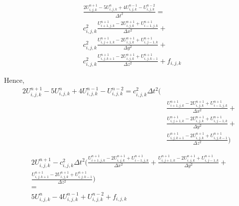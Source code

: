 \documentclass[12pt,a4paper]{report}
\begin{document}
\begin{equation}
\begin{aligned}
&\frac{2 U^{n+1}_{i,j,k} - 5 U^{n}_{i,j,k} + 4 U^{n-1}_{i,j,k} - U^{n-2}_{i,j,k}}{\Delta t^2} = \\
& c^2_{i,j,k} \frac{U^{n+1}_{i+1,j,k} - 2 U^{n+1}_{i,j,k} + U^{n+1}_{i-1,j,k}}{\Delta x^2} +\\
& c^2_{i,j,k} \frac{U^{n+1}_{i,j+1,k} - 2 U^{n+1}_{i,j,k} + U^{n+1}_{i,j-1,k}}{\Delta y^2} + \\
& c^2_{i,j,k} \frac{U^{n+1}_{i,j,k+1} - 2 U^{n+1}_{i,j,k} + U^{n+1}_{i,j,k-1}}{\Delta z^2} + f_{i,j,k}
\end{aligned}
\end{equation}

Hence,
\begin{equation}
\begin{aligned}
2 U^{n+1}_{i,j,k} - 5 U^{n}_{i,j,k} + 4 U^{n-1}_{i,j,k} - U^{n-2}_{i,j,k} = c^2_{i,j,k} \Delta t^2 (\\
& \frac{U^{n+1}_{i+1,j,k} - 2 U^{n+1}_{i,j,k} + U^{n+1}_{i-1,j,k}}{\Delta x^2} +\\
& \frac{U^{n+1}_{i,j+1,k} - 2 U^{n+1}_{i,j,k} + U^{n+1}_{i,j-1,k}}{\Delta y^2} + \\
& \frac{U^{n+1}_{i,j,k+1} - 2 U^{n+1}_{i,j,k} + U^{n+1}_{i,j,k-1}}{\Delta z^2} )
\end{aligned}
\end{equation}

\begin{equation}
\begin{aligned}
2 U^{n+1}_{i,j,k} - c^2_{i,j,k} \Delta t^2 (
\frac{U^{n+1}_{i+1,j,k} - 2 U^{n+1}_{i,j,k} + U^{n+1}_{i-1,j,k}}{\Delta x^2} +
\frac{U^{n+1}_{i,j+1,k} - 2 U^{n+1}_{i,j,k} + U^{n+1}_{i,j-1,k}}{\Delta y^2} + \\
\frac{U^{n+1}_{i,j,k+1} - 2 U^{n+1}_{i,j,k} + U^{n+1}_{i,j,k-1}}{\Delta z^2} ) \\= \\ 5 U^{n}_{i,j,k} - 4 U^{n-1}_{i,j,k} + U^{n-2}_{i,j,k} + f_{i,j,k}
\end{aligned}
\end{equation}
\fi
\end{document}
